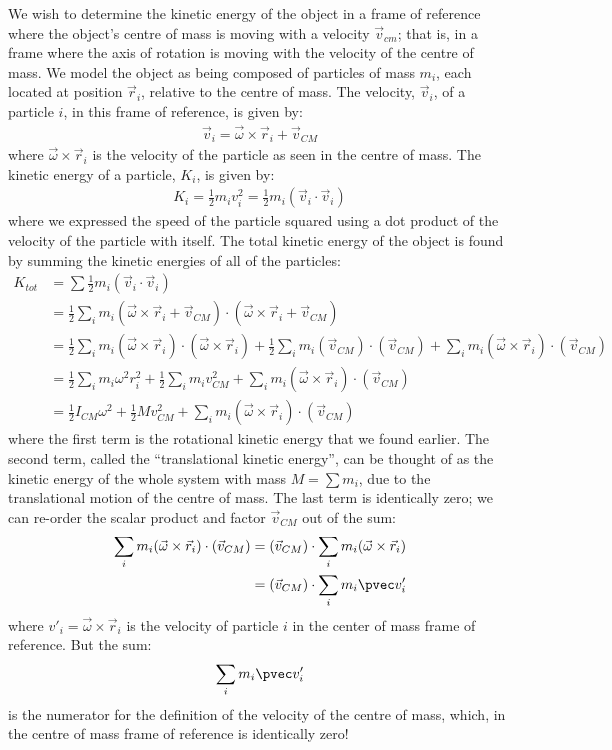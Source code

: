 We wish to determine the kinetic energy of the object in a frame of reference where the object's  centre of mass is moving with a velocity $\vec v_{cm}$; that is, in a frame where the axis of rotation is moving with the velocity of the centre of mass. We model the object as being composed of particles of mass $m_i$, each located at position $\vec r_i$, relative to the centre of mass. The velocity, $\vec v_i$, of a particle $i$, in this frame of reference, is given by:
\begin{align*}
\vec v_i = \vec\omega \times \vec r_i + \vec v_{CM}
\end{align*}
where $\vec\omega \times \vec r_i$ is the velocity of the particle as seen in the centre of mass. The kinetic energy of a particle, $K_i$, is given by:
\begin{align*}
K_i = \frac{1}{2}m_iv_i^2 = \frac{1}{2}m_i(\vec v_i\cdot \vec v_i)
\end{align*}
where we expressed the speed of the particle squared using a dot product of the velocity of the particle with itself. The total kinetic energy of the object is found by summing the kinetic energies of all of the particles:
\begin{align*}
K_{tot} &= \sum \frac{1}{2}m_i(\vec v_i\cdot \vec v_i) \\
&=\frac{1}{2} \sum_i m_i (\vec\omega \times \vec r_i + \vec v_{CM}) \cdot (\vec\omega \times \vec r_i + \vec v_{CM})\\
&=\frac{1}{2} \sum_i m_i (\vec\omega \times \vec r_i)\cdot(\vec\omega \times \vec r_i ) + \frac{1}{2} \sum_i m_i (\vec v_{CM}) \cdot (\vec v_{CM}) + \sum_i m_i (\vec\omega \times \vec r_i) \cdot (\vec v_{CM})\\
&=\frac{1}{2}  \sum_i m_i \omega^2r_i^2 + \frac{1}{2} \sum_i m_i v_{CM}^2 + \sum_i m_i (\vec\omega \times \vec r_i) \cdot (\vec v_{CM})\\
&=\frac{1}{2} I_{CM}\omega ^2 + \frac{1}{2}M v_{CM}^2+\sum_i m_i (\vec\omega \times \vec r_i) \cdot (\vec v_{CM})
\end{align*} 
where the first term is the rotational kinetic energy that we found earlier. The second term, called the ``translational kinetic energy'', can be thought of as the kinetic energy of the whole system with mass $M=\sum m_i$, due to the translational motion of the centre of mass. The last term is identically zero; we can re-order the scalar product and factor $\vec v_{CM}$ out of the sum:
\begin{align*}
\sum_i m_i (\vec\omega \times \vec r_i) \cdot (\vec v_{CM}) &= (\vec v_{CM}) \cdot \sum_i m_i (\vec\omega \times \vec r_i)\\
&=(\vec v_{CM}) \cdot \sum_i m_i \pvec v'_{i}
\end{align*}
where $v'_{i} = \vec\omega \times \vec r_i$ is the velocity of particle $i$ in the center of mass frame of reference. But the sum:
\begin{align*}
\sum_i m_i \pvec v'_{i}
\end{align*}
is the numerator for the definition of the velocity of the centre of mass, which, in the centre of mass frame of reference is identically zero!

